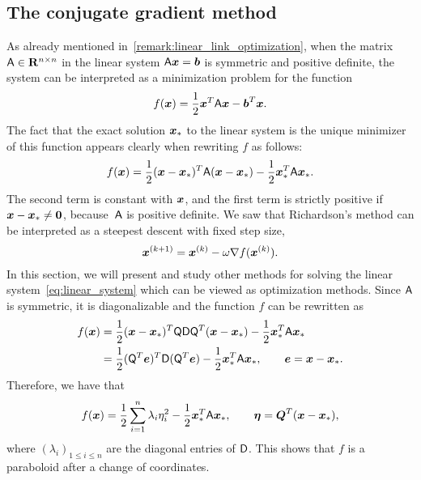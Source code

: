 \subsection{The conjugate gradient method}%
\label{sub:the_conjugate_gradient_method}

As already mentioned in~\cref{remark:linear_link_optimization},
when the matrix $\mathsf A \in \mathbf R^{n \times n}$ in the linear system $\mathsf A \mathbf{\boldsymbol{x}} = \mathbf{\boldsymbol{b}}$ is symmetric and positive definite,
the system can be interpreted as a minimization problem for the function
\begin{equation}
    \label{eq:function_optimization}
    f(\mathbf{\boldsymbol{x}}) = \frac{1}{2} \mathbf{\boldsymbol{x}}^T \mathsf A \mathbf{\boldsymbol{x}} - \mathbf{\boldsymbol{b}}^T \mathbf{\boldsymbol{x}}.
\end{equation}
The fact that
the exact solution $\mathbf{\boldsymbol{x}}_*$ to the linear system is the unique minimizer of this function appears clearly
when rewriting $f$ as follows:
\begin{equation}
    \label{eq:rewritten_expression_of_f}
    f(\mathbf{\boldsymbol{x}})
    = \frac{1}{2} (\mathbf{\boldsymbol{x}} - \mathbf{\boldsymbol{x}}_*)^T \mathsf A (\mathbf{\boldsymbol{x}} - \mathbf{\boldsymbol{x}}_*)  - \frac{1}{2} \mathbf{\boldsymbol{x}}_*^T \mathsf A \mathbf{\boldsymbol{x}}_{*}.
\end{equation}
The second term is constant with $\mathbf{\boldsymbol{x}}$,
and the first term is strictly positive if $\mathbf{\boldsymbol{x}} - \mathbf{\boldsymbol{x}}_* \neq \mathbf{\boldsymbol{0}}$,
because~$\mathsf A$ is positive definite.
We saw that Richardson's method can be interpreted as a steepest descent with fixed step size,
\[
    \mathbf{\boldsymbol{x}}^{(k+1)} = \mathbf{\boldsymbol{x}}^{(k)} - \omega \nabla f(\mathbf{\boldsymbol{x}}^{(k)}).
\]
In this section,
we will present and study other methods
for solving the linear system~\eqref{eq:linear_system}
which can be viewed as optimization methods.
Since $\mathsf A$ is symmetric,
it is diagonalizable and the function $f$ can be rewritten as
\begin{align*}
    f(\mathbf{\boldsymbol{x}})
    &= \frac{1}{2} (\mathbf{\boldsymbol{x}} - \mathbf{\boldsymbol{x}}_*)^T \mathsf Q \mathsf D \mathsf Q^T (\mathbf{\boldsymbol{x}} - \mathbf{\boldsymbol{x}}_*)  - \frac{1}{2} \mathbf{\boldsymbol{x}}_*^T \mathsf A \mathbf{\boldsymbol{x}}_{*} \\
    &= \frac{1}{2} (\mathsf Q^T \mathbf{\boldsymbol{e}})^T \mathsf D (\mathsf Q^T \mathbf{\boldsymbol{e}})  - \frac{1}{2} \mathbf{\boldsymbol{x}}_*^T \mathsf A \mathbf{\boldsymbol{x}}_{*}, \qquad  \mathbf{\boldsymbol{e}} = \mathbf{\boldsymbol{x}} - \mathbf{\boldsymbol{x}}_*.
\end{align*}
Therefore, we have that
\begin{align*}
    f(\mathbf{\boldsymbol{x}})= \frac{1}{2} \sum_{i=1}^{n} \lambda_i \eta_i^2 - \frac{1}{2} \mathbf{\boldsymbol{x}}_*^T \mathsf A \mathbf{\boldsymbol{x}}_{*}, \qquad  \mathbf{\boldsymbol{\eta}} = \mathbf{\boldsymbol{Q}}^T (\mathbf{\boldsymbol{x}} - \mathbf{\boldsymbol{x}}_*),
\end{align*}
where $(\lambda_i)_{1 \leq i \leq n}$ are the diagonal entries of $\mathsf D$.
This shows that $f$ is a paraboloid
after a change of coordinates.


